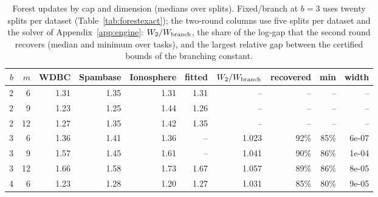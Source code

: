 \begin{table}[h]
\centering
\caption{Forest updates by cap and dimension (medians over splits). Fixed/branch at $b=3$ uses twenty splits per dataset (Table~\ref{tab:forestexact}); the two-round columns use five splits per dataset and the solver of Appendix~\ref{app:engine}: $W_2/W_{\rm branch}$, the share of the log-gap that the second round recovers (median and minimum over tasks), and the largest relative gap between the certified bounds of the branching constant.}
\label{tab:capdetail}
\small
\begin{tabular}{rrrrrrrrrr}
\toprule
$b$ & $m$ & WDBC & Spambase & Ionosphere & fitted & $W_2/W_{\rm branch}$ & recovered & min & width \\
\midrule
2 & 6 & 1.31 & 1.35 & 1.31 & 1.31 & -- & -- & -- & -- \\
2 & 9 & 1.23 & 1.25 & 1.44 & 1.26 & -- & -- & -- & -- \\
2 & 12 & 1.27 & 1.35 & 1.42 & 1.35 & -- & -- & -- & -- \\
3 & 6 & 1.36 & 1.41 & 1.36 & -- & 1.023 & 92\% & 85\% & 6e-07 \\
3 & 9 & 1.57 & 1.45 & 1.61 & -- & 1.041 & 90\% & 86\% & 1e-04 \\
3 & 12 & 1.66 & 1.58 & 1.73 & 1.67 & 1.057 & 89\% & 86\% & 8e-05 \\
4 & 6 & 1.23 & 1.28 & 1.20 & 1.27 & 1.031 & 85\% & 80\% & 9e-05 \\
\bottomrule
\end{tabular}
\end{table}
